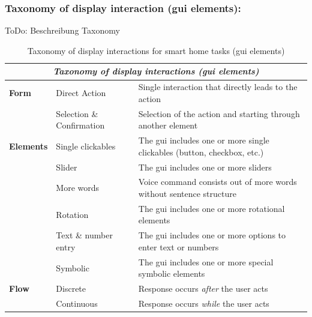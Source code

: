 \documentclass[sigchi]{acmart}
\begin{document}
	\subsubsection{Taxonomy of display interaction (\ac{gui} elements):}
	ToDo: Beschreibung Taxonomy
	\begin{table}[t]
		\begin{center}
			\caption{Taxonomy of display interactions for smart home tasks (\ac{gui} elements)}
			\label{tab:taxDisplayGUI}
			\begin{footnotesize}				
				\begin{tabular}{p{0.2\columnwidth} p{} p{}} \toprule
					\multicolumn{3}{c}{\textit{Taxonomy of display interactions (\ac{gui} elements)}} \\ \midrule
					\textbf{Form}		& Direct Action				& Single interaction that directly leads to the action \\
										& Selection \& Confirmation	& Selection of the action and starting through another element\\ \midrule
					\textbf{Elements} 	& Single clickables			& The \ac{gui} includes one or more single clickables 
																	  (button, checkbox, etc.) \\
										& Slider					& The \ac{gui} includes one or more sliders \\
										& More words				& Voice command consists out of more words without sentence structure \\
										& Rotation					& The \ac{gui} includes one or more rotational elements \\ 
										& Text \& number entry		& The \ac{gui} includes one or more options to enter text or numbers \\
										& Symbolic					& The \ac{gui} includes one or more special symbolic elements\\ \midrule
					\textbf{Flow}		& Discrete		& Response occurs \textit{after} the user acts \\ 
										& Continuous 	& Response occurs \textit{while} the user acts  \\ \bottomrule
				\end{tabular}
			\end{footnotesize}	
		\end{center}
	\end{table}	
\end{document}
